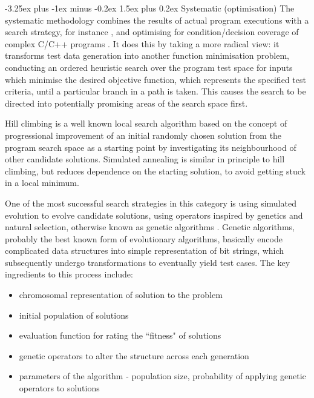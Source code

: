 \documentclass{icldt}
\makeatletter
\numberwithin{equation}{section}       %
\renewcommand{\paragraph}{\@startsection{paragraph}{4}{0ex}%
   {-3.25ex plus -1ex minus -0.2ex}%
   {1.5ex plus 0.2ex}%
   {\normalfont\normalsize\bfseries}}
\makeatother
\begin{document}
		\paragraph{Systematic (optimisation)}
The systematic methodology combines the results of actual program executions with a search strategy, for instance \cite{Tracey1998}, and optimising for condition/decision coverage of complex C/C++ programs \cite{Michael1998}. It does this by taking a more radical view: it transforms test data generation into another function minimisation problem, conducting an ordered heuristic search over the program test space for inputs which minimise the desired objective function, which represents the specified test criteria, until a particular branch in a path is taken. This causes the search to be directed into potentially promising areas of the search space first.

Hill climbing is a well known local search algorithm based on the concept of progressional improvement of an initial randomly chosen solution from the program search space as a starting point by investigating its neighbourhood of other candidate solutions. Simulated annealing is similar in principle to hill climbing, but reduces dependence on the starting solution, to avoid getting stuck in a local minimum.

One of the most successful search strategies in this category is using simulated evolution to evolve candidate solutions, using operators inspired by genetics and natural selection, otherwise known as genetic algorithms \cite{Pargas99}. Genetic algorithms, probably the best known form of evolutionary algorithms, basically encode complicated data structures into simple representation of bit strings, which subsequently undergo transformations to eventually yield test cases. The key ingredients to this process include:

\begin{itemize}
	\item chromosomal representation of solution to the problem
	\item initial population of solutions
	\item evaluation function for rating the ``fitness" of solutions
	\item genetic operators to alter the structure across each generation
	\item parameters of the algorithm - population size, probability of applying genetic operators to solutions
\end{itemize}
\end{document}
